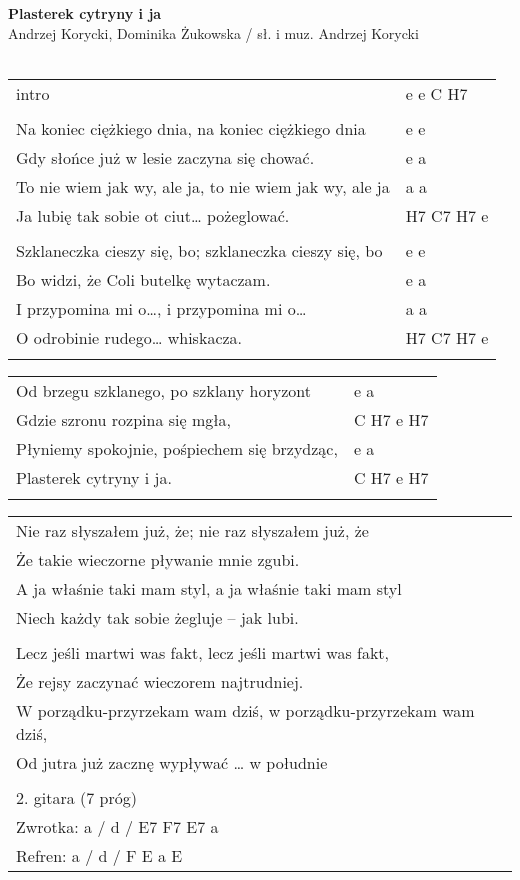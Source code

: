 \documentclass[a5paper]{article}
\begin{document}


\noindent
\fontsize{12pt}{15pt}\selectfont
\textbf{Plasterek cytryny i ja} \\
\fontsize{8pt}{10pt}\selectfont
Andrzej Korycki, Dominika Żukowska / sł. i muz. Andrzej Korycki \\ \\
\fontsize{10pt}{12pt}\selectfont
{}
\begin{tabular}{@{}p{8.50cm}p{3cm}@{}}
\noindent
intro & e e C H7 \\ \\
Na koniec ciężkiego dnia, na koniec ciężkiego dnia & e e \\
Gdy słońce już w lesie zaczyna się chować. & e a \\
To nie wiem jak wy, ale ja, to nie wiem jak wy, ale ja & a a \\
Ja lubię tak sobie ot ciut… pożeglować. & H7 C7 H7 e \\ \\

Szklaneczka cieszy się, bo; szklaneczka cieszy się, bo & e e \\
Bo widzi, że Coli butelkę wytaczam. & e a \\
I przypomina mi o…, i przypomina mi o… & a a \\
O odrobinie rudego… whiskacza. & H7 C7 H7 e \\ \\
\end{tabular}

\noindent
\begin{tabular}{@{}p{7.50cm}p{3cm}@{}}
Od brzegu szklanego, po szklany horyzont & e a \\
Gdzie szronu rozpina się mgła, & C H7 e H7 \\
Płyniemy spokojnie, pośpiechem się brzydząc, & e a \\
Plasterek cytryny i ja. & C H7 e H7 \\ \\
\end{tabular}

\noindent
\begin{tabular}{@{}p{11.50cm}@{}}
Nie raz słyszałem już, że; nie raz słyszałem już, że \\
Że takie wieczorne pływanie mnie zgubi. \\
A ja właśnie taki mam styl, a ja właśnie taki mam styl \\
Niech każdy tak sobie żegluje – jak lubi. \\ \\

Lecz jeśli martwi was fakt, lecz jeśli martwi was fakt, \\
Że rejsy zaczynać wieczorem najtrudniej. \\
W porządku-przyrzekam wam dziś, w porządku-przyrzekam wam dziś, \\
Od jutra już zacznę wypływać … w południe \\ \\

2. gitara (7 próg) \\
Zwrotka: a / d / E7 F7 E7 a \\
Refren: a / d / F E a E
\end{tabular}
\end{document}
